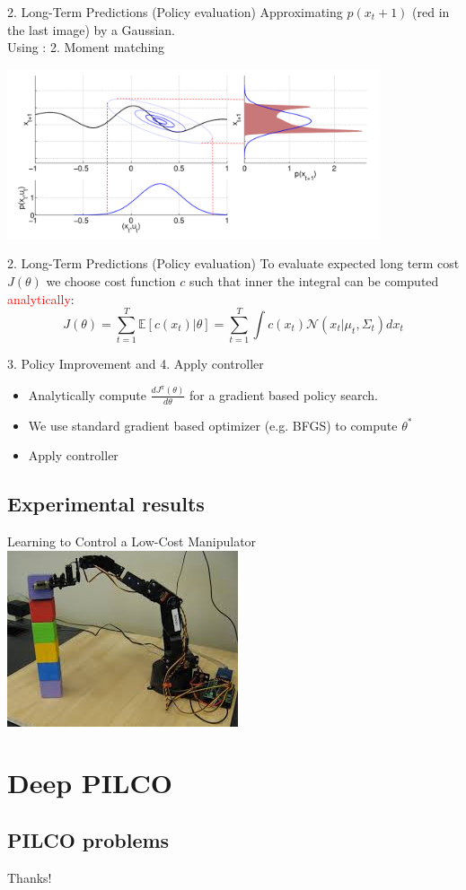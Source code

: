 \documentclass{beamer}
\begin{document}
\begin{frame}{2. Long-Term Predictions (Policy evaluation)}
Approximating $p(x_t+1)$ (red in the last image) by a Gaussian.\\
Using : 2. Moment matching
\begin{center}
    \includegraphics[height=5cm]{img/mom.png}
\end{center}
\end{frame}

\begin{frame}{2. Long-Term Predictions (Policy evaluation)}
To evaluate expected long term cost $J(\theta)$ we choose cost function $c$ such that inner the integral can be computed \textcolor{red}{analytically}:
$$J(\theta)=\sum_{t=1}^{T} \mathbb{E} [c(x_t)|\theta]=\sum_{t=1}^{T} \int c(x_t) \mathcal{N}(x_t|\mu_t,\Sigma_t) dx_t$$
\end{frame}

\begin{frame}{3. Policy Improvement and 4. Apply controller}
\begin{itemize}
    \item Analytically compute $\frac{d J^\pi (\theta)}{d\theta}$ for a gradient based policy search.
    \item We use standard gradient based optimizer (e.g. BFGS) to compute $\theta^*$
    \item Apply controller
\end{itemize}
\end{frame}

\subsection{Experimental results}
\begin{center}
Learning to Control a Low-Cost Manipulator
    \href{https://www.youtube.com/watch?v=gdT6dwUOYC0}{\includegraphics{img/arm.png}}
\end{center}

\section{Deep PILCO}
\subsection{PILCO problems}
\begin{frame}
  \Huge{\centerline{Thanks!}}
\end{frame}
\end{document}
